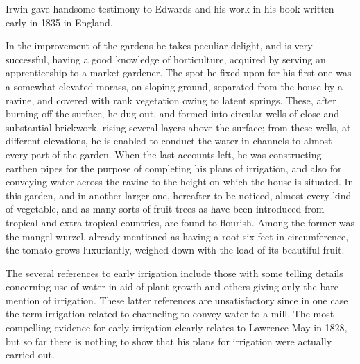 Irwin gave handsome testimony to Edwards and his work in his book
written early in 1835 in England.
\begin{Quote}
	In the improvement of the gardens he takes peculiar delight,
	and is very successful, having a good knowledge of
	horticulture, acquired by serving an apprenticeship to a
	market gardener.  The spot he fixed upon for his first one was
	a somewhat elevated mor\-ass, on sloping ground, separated
	from the house by a ravine, and covered with rank vegetation
	owing to latent springs.  These, after burning off the
	surface, he dug out, and formed into circular wells of close
	and substantial brickwork, rising several layers above the
	surface; from these wells, at different elevations, he is
	enabled to conduct the water in channels to almost every part
	of the garden.  When the last accounts left, he was
	constructing earthen pipes for
	the purpose of completing his plans of irrigation, and also
	for conveying water across the ravine to the height on which
	the house is situated.  In this garden, and in another larger
	one, hereafter to be noticed, almost every kind of vegetable,
	and as many sorts of fruit-trees as have been
	introduced from tropical and extra-tropical countries, are
	found to flourish.  Among the former was the mangel-wurzel,
	already mentioned as having a root six feet in circumference,
	the tomato grows luxuriantly, weighed down with the load of
	its beautiful fruit.
\end{Quote}

\closure
The several references to early irrigation include those with some
telling details concerning use of water in aid of plant growth and
others giving only the bare mention of irrigation. These latter
references are unsatisfactory since in one case the term irrigation
related to channeling to convey water to a mill.  The most compelling
evidence for early irrigation clearly relates to Lawrence May in 1828,
but so far there is nothing to show that his plans for irrigation were
actually carried out.

